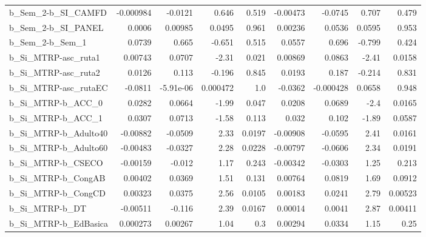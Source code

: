 \begin{tabular}{lrrrrrrrr}
b\_Sem\_2-b\_SI\_CAMFD         &   -0.000984 &      -0.0121 &     0.646 &    0.519 &   -0.00473 &     -0.0745 &        0.707 &         0.479 \\
b\_Sem\_2-b\_SI\_PANEL         &      0.0006 &      0.00985 &    0.0495 &    0.961 &    0.00236 &      0.0536 &       0.0595 &         0.953 \\
b\_Sem\_2-b\_Sem\_1            &      0.0739 &        0.665 &    -0.651 &    0.515 &     0.0557 &       0.696 &       -0.799 &         0.424 \\
b\_Si\_MTRP-asc\_ruta1        &     0.00743 &       0.0707 &     -2.31 &    0.021 &    0.00869 &      0.0863 &        -2.41 &        0.0158 \\
b\_Si\_MTRP-asc\_ruta2        &      0.0126 &        0.113 &    -0.196 &    0.845 &     0.0193 &       0.187 &       -0.214 &         0.831 \\
b\_Si\_MTRP-asc\_rutaEC       &     -0.0811 &    -5.91e-06 &  0.000472 &      1.0 &    -0.0362 &   -0.000428 &       0.0658 &         0.948 \\
b\_Si\_MTRP-b\_ACC\_0          &      0.0282 &       0.0664 &     -1.99 &    0.047 &     0.0208 &      0.0689 &         -2.4 &        0.0165 \\
b\_Si\_MTRP-b\_ACC\_1          &      0.0307 &       0.0713 &     -1.58 &    0.113 &      0.032 &       0.102 &        -1.89 &        0.0587 \\
b\_Si\_MTRP-b\_Adulto40       &    -0.00882 &      -0.0509 &      2.33 &   0.0197 &   -0.00908 &     -0.0595 &         2.41 &        0.0161 \\
b\_Si\_MTRP-b\_Adulto60       &    -0.00483 &      -0.0327 &      2.28 &   0.0228 &   -0.00797 &     -0.0606 &         2.34 &        0.0191 \\
b\_Si\_MTRP-b\_CSECO          &    -0.00159 &       -0.012 &      1.17 &    0.243 &   -0.00342 &     -0.0303 &         1.25 &         0.213 \\
b\_Si\_MTRP-b\_CongAB         &     0.00402 &       0.0369 &      1.51 &    0.131 &    0.00764 &      0.0819 &         1.69 &        0.0912 \\
b\_Si\_MTRP-b\_CongCD         &     0.00323 &       0.0375 &      2.56 &   0.0105 &    0.00183 &      0.0241 &         2.79 &       0.00523 \\
b\_Si\_MTRP-b\_DT             &    -0.00511 &       -0.116 &      2.39 &   0.0167 &    0.00014 &      0.0041 &         2.87 &       0.00411 \\
b\_Si\_MTRP-b\_EdBasica       &    0.000273 &      0.00267 &      1.04 &      0.3 &    0.00294 &      0.0334 &         1.15 &          0.25 \\

\end{tabular}
